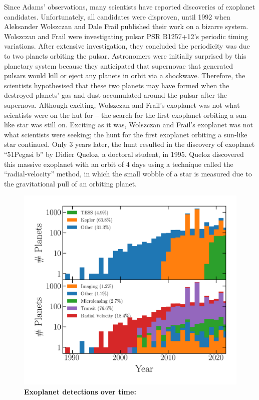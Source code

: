 Since Adams' observations, many scientists have reported discoveries of exoplanet candidates.
Unfortunately, all candidates were disproven, until 1992 when Aleksander Wolszczan and Dale Frail published their work on a bizarre system. 
Wolszczan and Frail were investigating  pulsar PSR B1257+12's periodic timing variations.
After extensive investigation, they concluded the periodicity was due to two planets orbiting the pulsar. 
Astronomers were initially surprised by this planetary system because they anticipated that supernovae that generated pulsars would kill or eject any planets in orbit via a shockwave. 
Therefore, the scientists hypothesised that these two planets may have formed when the destroyed planets' gas and dust accumulated around the pulsar after the supernova.
Although exciting, Wolszczan and Frail's exoplanet was not what scientists were on the hut for -- the search for the first exoplanet orbiting a sun-like star was still on.
Exciting as it was, Wolszczan and Frail's exoplanet was not what scientists were seeking; the hunt for the first exoplanet orbiting a sun-like star continued.
Only 3 years later, the hunt resulted in the discovery of exoplanet ``51Pegasi b'' by Didier Queloz, a doctoral student, in 1995.
Queloz discovered this massive exoplanet with an orbit of 4 days using a technique called the ``radial-velocity'' method, in which the small wobble of a star is measured due to the gravitational pull of an orbiting planet. 


\begin{figure}
\begin{center}
  \centerline{\includegraphics[width=1.\linewidth]{src/figures/confirmed_planets_vs_time.png}}
  \caption{\textbf{Exoplanet detections over time:}  }
  \label{fig:exo_detections_over_time}
\end{center}
\end{figure}


